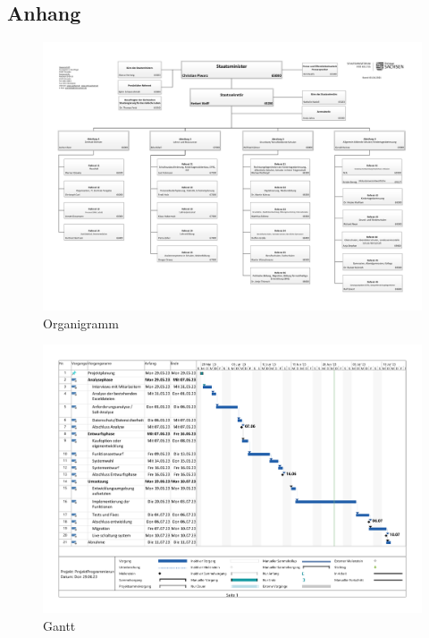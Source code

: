 \subsection*{Anhang}
\label{anhang}
\appendix

\begin{figure}[htb]
    \centering
    \includegraphics[angle=90, page=1,height=0.90\textheight, keepaspectratio]{anhang/abb/21_01_06_Organigramm_SMK.pdf}
    \caption[Beschreibung]{Organigramm}
    \label{abb:Organigramm}
\end{figure}

\begin{figure}[htb]
    \centering
    \includegraphics[angle=90, page=1,height=0.90\textheight, keepaspectratio]{anhang/abb/ProjektProgrammierungZeitplan.pdf}
    \caption[Beschreibung]{Gantt}
    \label{abb:Gantt}
\end{figure}


